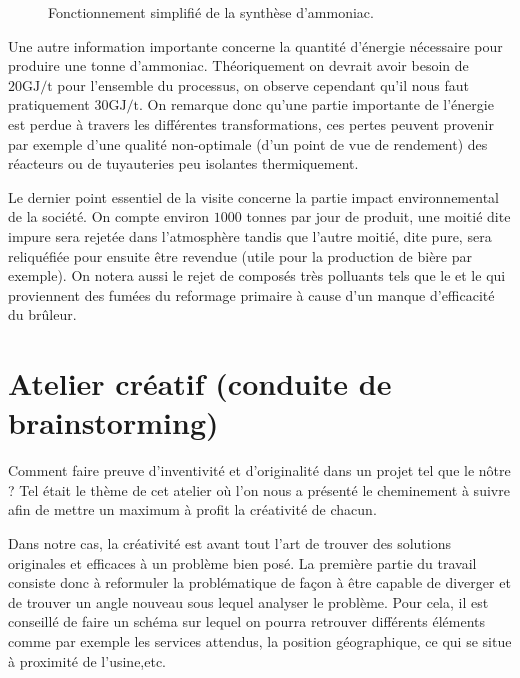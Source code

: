 \documentclass[a4paper, oneside, 12pt]{article}
\begin{document}
\begin{figure}[h!]
	\begin{center}
		
	\end{center}
	\caption{Fonctionnement simplifié de la synthèse d'ammoniac.}
	\label{fig:synthese}
\end{figure}

Une autre information importante concerne la quantité d'énergie nécessaire pour produire
une tonne d'ammoniac. Théoriquement on devrait avoir besoin de $20 \si{\giga\joule/\tonne}$
pour l'ensemble du processus, on observe cependant qu'il nous faut 
pratiquement $30 \si{\giga\joule/\tonne}$. On remarque donc qu'une partie 
importante de l'énergie est perdue à travers les différentes transformations, 
ces pertes peuvent provenir par exemple d'une qualité non-optimale (d'un point de vue 
de rendement) des réacteurs ou de tuyauteries peu isolantes thermiquement.

Le dernier point essentiel de la visite concerne la partie impact environnemental 
de la société. On compte environ $1000$ tonnes par jour de  produit, une moitié
dite impure sera rejetée dans l'atmosphère tandis que l'autre moitié, dite pure, 
sera reliquéfiée pour ensuite être revendue (utile pour la production de bière par exemple).
On notera aussi le rejet de composés très polluants tels que le  et le  
qui proviennent des fumées du reformage primaire à cause d'un manque d'efficacité
du brûleur.

\section{Atelier créatif (conduite de brainstorming)}

Comment faire preuve d'inventivité et d'originalité dans un projet tel que le nôtre ?
Tel était le thème de cet atelier où l'on nous a présenté le cheminement 
à suivre afin de mettre un maximum à profit la créativité de chacun.

Dans notre cas, la créativité est avant tout l'art de trouver des solutions 
originales et efficaces à un problème bien posé. 
La première partie du travail consiste donc à reformuler la problématique de façon 
à être capable de diverger et de trouver un angle nouveau sous lequel analyser le problème. 
Pour cela, il est conseillé de faire un schéma sur lequel on pourra retrouver différents
éléments comme par exemple les services attendus, la position géographique, 
ce qui se situe à proximité de l’usine,etc.
\end{document}
